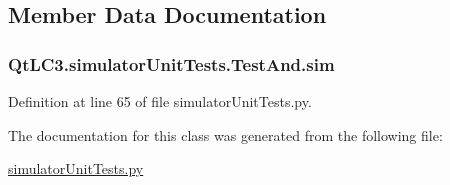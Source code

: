 \subsection{Member Data Documentation}
\hypertarget{class_qt_l_c3_1_1simulator_unit_tests_1_1_test_and_abfd247caf206df6fe94b24b0deb32469}{
\subsubsection[{sim}]{\setlength{\rightskip}{0pt plus 5cm}Qt\-L\-C3.\-simulator\-Unit\-Tests.\-Test\-And.\-sim}}\label{class_qt_l_c3_1_1simulator_unit_tests_1_1_test_and_abfd247caf206df6fe94b24b0deb32469}


Definition at line 65 of file simulator\-Unit\-Tests.\-py.



The documentation for this class was generated from the following file\-:\begin{DoxyCompactItemize}
\item 
\hyperlink{simulator_unit_tests_8py}{simulator\-Unit\-Tests.\-py}\end{DoxyCompactItemize}
